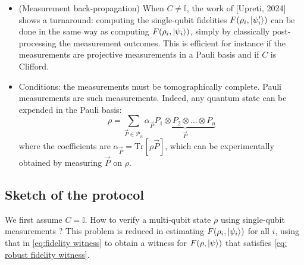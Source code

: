 \documentclass[a4paper,unpublished,onecolumn,11pt]{quantumarticle}
\begin{document}
\begin{itemize}
    
    \item (Measurement back-propagation) When $C\neq \mathbb I$, the work of [Upreti, 2024] shows a turnaround: 
    computing the single-qubit fidelities $F(\rho_i, \ket{\psi'_i})$ can be done in the same way as computing $F(\rho_i, \ket{\psi_i})$, simply by classically post-processing the measurement outcomes. This is efficient for instance if the measurements are projective measurements in a Pauli basis and if $C$ is Clifford.


    \item Conditions: the measurements must be tomographically complete. Pauli measurements are such measurements. Indeed, any quantum state can be expended in the Pauli basis:
    \begin{equation}
        \rho = \sum_{\vec{P}\in \mathcal{P}_n} \alpha_{\vec P} \underbrace{P_1\otimes P_2\otimes ...\otimes P_n}_{\vec P}
    \end{equation}
    where the coefficients are $\alpha_{\vec P} = \mathrm{Tr}[\rho \vec P]$, which can be experimentally obtained by measuring ${\vec P}$ on $\rho$.
\end{itemize}

\subsection{Sketch of the protocol}

We first assume $C=\mathbb I$.
How to verify a multi-qubit state $\rho$ using single-qubit measurements ? This problem is reduced in estimating $F(\rho_i, \ket{\psi_i})$ for all $i$, using that in \eqref{eq:fidelity witness} to obtain a witness for $F(\rho, \ket \psi)$ that satisfies \eqref{eq: robust fidelity witness}.
\end{document}
